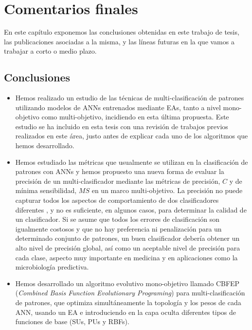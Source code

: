 \paginavaciasincuerpo
\chapter{Comentarios finales}
\noindent En este capítulo exponemos las conclusiones obtenidas en este trabajo de tesis,
las
publicaciones asociadas a la misma, y las líneas futuras en la que vamos a trabajar a corto o medio
plazo.

\section{Conclusiones}
\begin{itemize}
	\item Hemos realizado un estudio de las técnicas de multi-clasificación
		de patrones utilizando modelos de ANNs entrenados mediante EAs,  tanto a nivel mono-objetivo
	como multi-objetivo,	incidiendo en esta última propuesta. Este estudio se
	ha incluido en esta tesis con una revisión de trabajos previos realizados en este
	área, justo
	antes de explicar cada uno de los algoritmos que hemos desarrollado.

	\item Hemos estudiado las métricas que usualmente se utilizan en la clasificación de
	patrones con
	ANNs y hemos propuesto una nueva forma de evaluar la precisión de un multi-clasificador
	mediante las
	métricas de precisión, $C$ y de mínima sensibilidad, $MS$ en un marco
	multi-objetivo. La precisión no puede capturar todos los aspectos de comportamiento	de
	dos
	clasificadores diferentes \cite{Provost1997,Provost1998}, y no es
	suficiente, en algunos casos, para	determinar la calidad de un clasificador. Si se
	asume que todos los errores de clasificación son igualmente costosos y que no hay
	preferencia ni penalización para un determinado conjunto	de patrones, un buen
   clasificador	debería obtener un alto nivel de precisión global, así como un aceptable
	nivel de	precisión para cada clase, aspecto muy importante en medicina y en
	aplicaciones
	como la microbiología predictiva.

	\item Hemos desarrollado un algoritmo evolutivo mono-objetivo llamado CBFEP
(\textit{Combined
	Basis Function Evolutionary Programing}) para multi-clasificación de	patrones, que optimiza
	simultáneamente la topología y los pesos de cada ANN, usando un EA e	introduciendo en la capa
	oculta diferentes tipos de funciones de base (SUs, PUs y RBFs).


\end{itemize}
